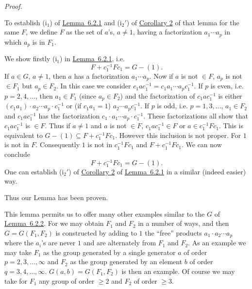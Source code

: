 \documentclass[b5paper,twoside]{article}
\newcommand{\lemref}[2]{\hyperref[#1]{\mbox{Lemma~#2}}}
\theoremstyle{mvnplain}
\renewenvironment{proof}[1][Proof]{%
  \par\addvspace{0.35\baselineskip}%
  \noindent\textit{#1.}\ \normalfont\ignorespaces
}{%
  \par\addvspace{0.35\baselineskip}%
}
\def\mathfrak#1{#1}%
\begin{document}
\begin{proof}
To establish (i$_1$) of \lemref{lem:6.2.1}{6.2.1} and (i$_2'$) of
\hyperref[cor:6.2.2]{Corollary 2} of that lemma for the same $\mathfrak F$,
we define $\mathfrak F$ as the
set of $a$'s, $a\ne1$, having a factorization $a_1\cdots a_p$ in which $a_p$
is in $\mathfrak F_1$.

We show firstly (i$_1$) in \lemref{lem:6.2.1}{6.2.1}, i.e.
\[
  \mathfrak F+c_1^{-1}\mathfrak F c_1=\mathfrak G-(1).
\]
If $a\in\mathfrak G$, $a\ne1$, then $a$ has a factorization
$a_1\cdots a_p$. Now if $a$ is not $\in\mathfrak F$, $a_p$ is not
$\in\mathfrak F_1$ but $a_p\in\mathfrak F_2$. In this case we consider
$c_1ac_1^{-1}=c_1a_1\cdots a_pc_1^{-1}$. If $p$ is even, i.e.
$p=2,4,\ldots$, then $a_1\in\mathfrak F_1$ (since
$a_p\in\mathfrak F_2$) and the factorization of $c_1ac_1^{-1}$ is either
$(c_1a_1)\cdot a_2\cdots a_p\cdot c_1^{-1}$ or (if $c_1a_1=1$)
$a_2\cdots a_p c_1^{-1}$. If $p$ is odd, i.e. $p=1,3,\ldots$,
$a_1\in\mathfrak F_2$ and $c_1ac_1^{-1}$ has the factorization
$c_1\cdot a_1\cdots a_p\cdot c_1^{-1}$. These factorizations all show that
$c_1ac_1^{-1}$ is $\in\mathfrak F$. Thus if $a\ne1$ and $a$ is not
$\in\mathfrak F$, $c_1ac_1^{-1}\in\mathfrak F$ or
$a\in c_1^{-1}\mathfrak F c_1$. This is equivalent to
$\mathfrak G-(1)\subseteq\mathfrak F+c_1^{-1}\mathfrak F c_1$. However this
inclusion is not proper. For $1$ is not in $\mathfrak F$. Consequently $1$
is not in $c_1^{-1}\mathfrak F c_1$ and
$\mathfrak F+c_1^{-1}\mathfrak F c_1$. We can now conclude
\[
  \mathfrak F+c_1^{-1}\mathfrak F c_1=\mathfrak G-(1).
\]
One can establish (i$_2'$) of \hyperref[cor:6.2.2]{Corollary 2} of
\lemref{lem:6.2.1}{6.2.1} in
a similar (indeed easier) way.

Thus our Lemma has been proven.
\end{proof}

This lemma permits us to offer many other examples similar to the $\mathfrak G$
of \lemref{lem:6.2.2}{6.2.2}. For we may obtain $\mathfrak F_1$ and
$\mathfrak F_2$ in a number of ways, and then
$\mathfrak G=\mathfrak G(\mathfrak F_1,\mathfrak F_2)$ is constructed by
adding to $1$ the ``free'' products $a_1\cdot a_2\cdots a_p$ where the $a_i$'s
are never $1$ and are alternately from $\mathfrak F_1$ and $\mathfrak F_2$.
As an example we may take $\mathfrak F_1$ as the group generated by a single
generator $a$ of order $p=2,3,\ldots,\infty$ and $\mathfrak F_2$ as the group
generated by an element $b$ of order $q=3,4,\ldots,\infty$.
$\mathfrak G(a,b)=\mathfrak G(\mathfrak F_1,\mathfrak F_2)$ is then an
example. Of course we may take for $\mathfrak F_1$ any group of order $\geq2$
and $\mathfrak F_2$ of order $\geq3$.
\end{document}
